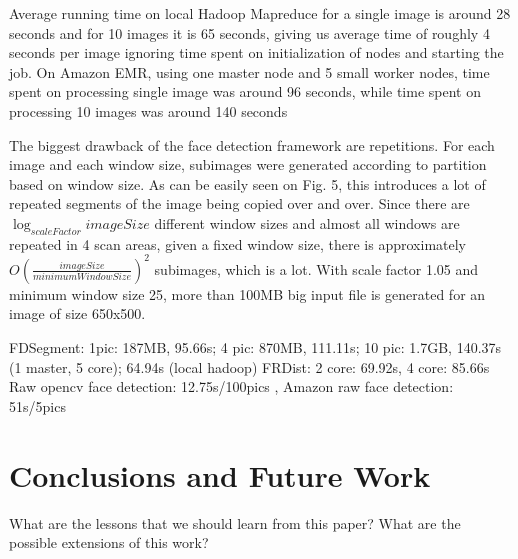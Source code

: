 \documentclass[11pt, draftclsnofoot, onecolumn]{IEEEtran}
\begin{document}
Average running time on local Hadoop Mapreduce for a single image is around 28 seconds and for 10 images it is 65 seconds, giving us average time of roughly 4 seconds per image ignoring time spent on initialization of nodes and starting the job. On Amazon EMR, using one master node and 5 small worker nodes, time spent on processing single image was around 96 seconds, while time spent on processing 10 images was around 140 seconds

The biggest drawback of the face detection framework are repetitions. For each image and each window size, subimages were generated according to partition based on window size. As can be easily seen on Fig. 5, this introduces a lot of repeated segments of the image being copied over and over. Since there are $\log_{scaleFactor}{imageSize}$ different window sizes and almost all windows are repeated in 4 scan areas, given a fixed window size, there is approximately $O(\frac{imageSize}{minimumWindowSize})^{2} $ subimages, which is a lot. With scale factor 1.05 and minimum window size 25, more than 100MB big input file is generated for an image of size 650x500.

FDSegment: 1pic: 187MB, 95.66s; 4 pic: 870MB, 111.11s; 10 pic: 1.7GB, 140.37s (1 master, 5 core); 64.94s (local hadoop)
FRDist: 2 core: 69.92s, 4 core: 85.66s
Raw opencv face detection: 12.75s/100pics , Amazon raw face detection: 51s/5pics

\section{Conclusions and Future Work} \label{sec:conclusion}

What are the lessons that we should learn from this paper? 
What are the possible extensions of this work?


   
\end{document}
